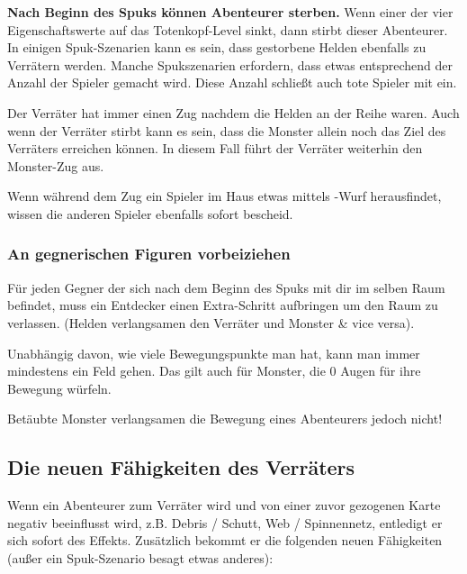 \textbf{Nach Beginn des Spuks können Abenteurer sterben.} Wenn einer der vier Eigenschaftswerte auf das Totenkopf-Level sinkt, dann stirbt dieser Abenteurer. In einigen Spuk-Szenarien kann es sein, dass gestorbene Helden ebenfalls zu Verrätern werden. Manche Spukszenarien erfordern, dass etwas entsprechend der Anzahl der Spieler gemacht wird. Diese Anzahl schließt auch tote Spieler mit ein.

Der Verräter hat immer einen Zug nachdem die Helden an der Reihe waren. Auch wenn der Verräter stirbt kann es sein, dass die Monster allein noch das Ziel des Verräters erreichen können. In diesem Fall führt der Verräter weiterhin den Monster-Zug aus.

Wenn während dem Zug ein Spieler im Haus etwas mittels \know-Wurf herausfindet, wissen die anderen Spieler ebenfalls sofort bescheid.

\subsubsection{An gegnerischen Figuren vorbeiziehen}

Für jeden Gegner der sich nach dem Beginn des Spuks mit dir im selben Raum befindet, muss ein Entdecker einen Extra-Schritt aufbringen um den Raum zu verlassen. (Helden verlangsamen den Verräter und Monster \& vice versa).

Unabhängig davon, wie viele Bewegungspunkte man hat, kann man immer mindestens ein Feld gehen. Das gilt auch für Monster, die 0 Augen für ihre Bewegung würfeln.

Betäubte Monster verlangsamen die Bewegung eines Abenteurers jedoch nicht!

\subsection{Die neuen Fähigkeiten des Verräters}
\label{kap:rule:newtraitorpowers}

Wenn ein Abenteurer zum Verräter wird und von einer zuvor gezogenen Karte negativ beeinflusst wird, z.B. Debris / Schutt, Web / Spinnennetz, entledigt er sich sofort des Effekts. Zusätzlich bekommt er die folgenden neuen Fähigkeiten (außer ein Spuk-Szenario besagt etwas anderes):

